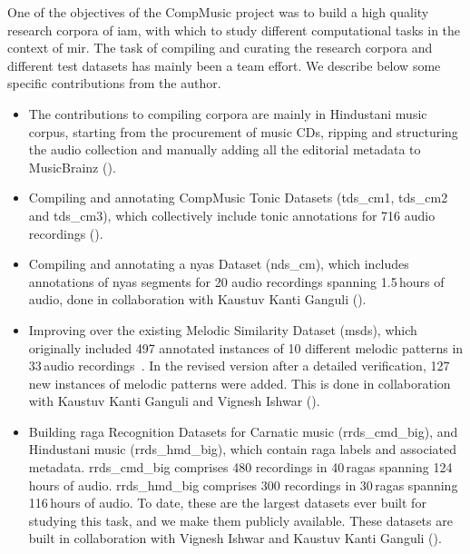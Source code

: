 One of the objectives of the CompMusic project was to build a high quality research corpora of \gls{iam}, with which to study different computational tasks in the context of \gls{mir}. The task of compiling and curating the research corpora and different test datasets has mainly been a team effort. We describe below some specific contributions from the author. 

\begin{itemize}
	
	\item The contributions to compiling corpora are mainly in Hindustani music corpus, starting from the procurement of music CDs, ripping and structuring the audio collection and manually adding all the editorial metadata to MusicBrainz (). 

	\item Compiling and annotating CompMusic Tonic Datasets (\acrshort{tds_cm1}, \acrshort{tds_cm2} and \acrshort{tds_cm3}), which collectively include tonic annotations for 716 audio recordings ().	
	
	\item Compiling and annotating a \Gls{nyas} Dataset (\acrshort{nds_cm}), which includes annotations of \gls{nyas} segments for 20 audio recordings spanning 1.5\,hours of audio, done in collaboration with Kaustuv Kanti Ganguli (). 
	
	\item Improving over the existing Melodic Similarity Dataset (\acrshort{msds}), which originally included 497 annotated instances of 10 different melodic patterns in 33\,audio recordings~\citep{Ishwar2013,Ross2012b}. In the revised version after a detailed verification, 127\,new instances of melodic patterns were added. This is done in collaboration with Kaustuv Kanti Ganguli and Vignesh Ishwar ().
	
	\item Building \Gls{raga} Recognition Datasets for Carnatic music (\acrshort{rrds_cmd_big}), and Hindustani music (\acrshort{rrds_hmd_big}), which contain \gls{raga} labels and associated metadata. \acrshort{rrds_cmd_big} comprises 480 recordings in 40\,\glspl{raga} spanning 124\,hours of audio. \acrshort{rrds_hmd_big} comprises 300 recordings in 30\,\glspl{raga} spanning 116\,hours of audio. To date, these are the largest datasets ever built for studying this task, and we make them publicly available. These datasets are built in collaboration with Vignesh Ishwar and Kaustuv Kanti Ganguli ().
	
\end{itemize}


